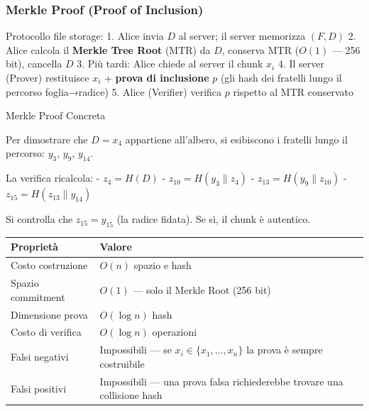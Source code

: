 \documentclass[
  italian,
  openany]{book}
\newcounter{none} %
\begin{document}
\subsubsection{Merkle Proof (Proof of
Inclusion)}\label{merkle-proof-proof-of-inclusion}

Protocollo file storage: 1. Alice invia \(D\) al server; il server
memorizza \((F, D)\) 2. Alice calcola il \textbf{Merkle Tree Root} (MTR)
da \(D\), conserva MTR (\(O(1)\) --- 256 bit), cancella \(D\) 3. Più
tardi: Alice chiede al server il chunk \(x_i\) 4. Il server (Prover)
restituisce \(x_i\) + \textbf{prova di inclusione} \(p\) (gli hash dei
fratelli lungo il percorso foglia→radice) 5. Alice (Verifier) verifica
\(p\) rispetto al MTR conservato

\begin{callouttip}{Merkle Proof Concreta}

Per dimostrare che \(D = x_4\) appartiene all'albero, si esibiscono i
fratelli lungo il percorso: \(y_3\), \(y_9\), \(y_{14}\).

La verifica ricalcola: - \(z_4 = H(D)\) - \(z_{10} = H(y_3 \| z_4)\) -
\(z_{13} = H(y_9 \| z_{10})\) - \(z_{15} = H(z_{13} \| y_{14})\)

Si controlla che \(z_{15} = y_{15}\) (la radice fidata). Se sì, il chunk
è autentico.

\end{callouttip}

{\def\LTcaptype{none} %
\begin{longtable}[]{@{}
  >{\raggedright\arraybackslash}p{}
  >{\raggedright\arraybackslash}p{}@{}}
\toprule\noalign{}
\begin{minipage}[b]{\linewidth}\raggedright
Proprietà
\end{minipage} & \begin{minipage}[b]{\linewidth}\raggedright
Valore
\end{minipage} \\
\midrule\noalign{}
\endhead
\bottomrule\noalign{}
\endlastfoot
Costo costruzione & \(O(n)\) spazio e hash \\
Spazio commitment & \(O(1)\) --- solo il Merkle Root (256 bit) \\
Dimensione prova & \(O(\log n)\) hash \\
Costo di verifica & \(O(\log n)\) operazioni \\
Falsi negativi & Impossibili --- se \(x_i \in \{x_1,\ldots,x_n\}\) la
prova è sempre costruibile \\
Falsi positivi & Impossibili --- una prova falsa richiederebbe trovare
una collisione hash \\
\end{longtable}
}
\end{document}
